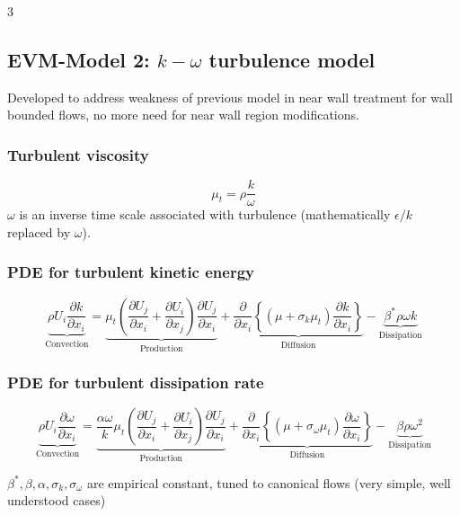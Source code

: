 \documentclass[landscape, a4paper]{article}
\begin{document}
\begin{multicols*}{3}
\subsection{EVM-Model 2: $k-\omega$ turbulence model}
Developed to address weakness of previous model in near wall treatment for wall bounded flows, no more need for near wall region modifications.

\subsubsection{Turbulent viscosity}
\[
  \mu_t = \rho\frac{k}{\omega}
\]
$\omega$ is an inverse time scale associated with turbulence (mathematically $\epsilon/k$ replaced by $\omega$).

\subsubsection{PDE for turbulent kinetic energy}
\[
  \underbrace{\rho U_i\frac{\partial k}{\partial x_i}}_{\text{Convection}}
  = \underbrace{\mu_t\left(
      \frac{\partial U_j}{\partial x_i}+\frac{\partial U_i}{\partial x_j}
    \right)\frac{\partial U_j}{\partial x_i}}_{\text{Production}}
  + \underbrace{\frac{\partial}{\partial x_i}\left\{
      (\mu+\sigma_k\mu_t)\frac{\partial k}{\partial x_i}
    \right\}}_{\text{Diffusion}}
  - \underbrace{\beta^*\rho\omega k}_{\text{Dissipation}}
\]

\subsubsection{PDE for turbulent dissipation rate}
\[
  \underbrace{\rho U_i\frac{\partial\omega}{\partial x_i}}_{\text{Convection}}
  = \underbrace{\frac{\alpha\omega}{k}\mu_t\left(
      \frac{\partial U_j}{\partial x_i}+\frac{\partial U_i}{\partial x_j}
    \right)\frac{\partial U_j}{\partial x_i}}_{\text{Production}}
  + \underbrace{\frac{\partial}{\partial x_i}\left\{
      (\mu+\sigma_\omega\mu_t)\frac{\partial\omega}{\partial x_i}
    \right\}}_{\text{Diffusion}}
  - \underbrace{\beta\rho\omega^2}_{\text{Dissipation}}
\]

$\beta^*,\beta,\alpha,\sigma_k,\sigma_\omega$ are empirical constant, tuned to canonical flows (very simple, well understood cases)


\end{multicols*}
\end{document}
